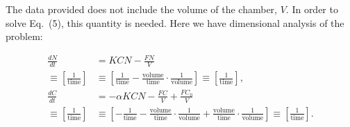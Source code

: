 The data provided does not include the volume of the chamber, $V$.  In order to solve Eq.\ (5), this quantity is needed.  Here we have dimensional analysis of the problem:

\begin{align*}
  \frac{dN}{dt} &= KCN - \frac{FN}{V} \\
  \equiv \left[ \frac{1}{\text{time}} \right] &\equiv \left[ \frac{1}{\text{time}} - \frac{\text{volume}}{\text{time}} \cdot \frac{1}{\text{volume}} \right] \equiv \left[ \frac{1}{\text{time}} \right], \\
  \frac{dC}{dt} &= -\alpha KCN - \frac{FC}{V} + \frac{FC_0}{V} \\
  \equiv \left[ \frac{1}{\text{time}} \right] &\equiv \left[ -\frac{1}{\text{time}} - \frac{\text{volume}}{\text{time}} \cdot \frac{1}{\text{volume}} + \frac{\text{volume}}{\text{time}} \cdot \frac{1}{\text{volume}} \right] \equiv \left[ \frac{1}{\text{time}} \right].
\end{align*}




